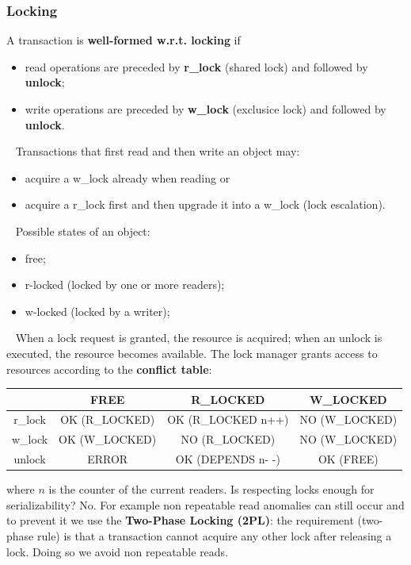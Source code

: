 \subsubsection{Locking}
A transaction is \textbf{well-formed w.r.t. locking} if
\begin{itemize}
    \item read operations are preceded by \textbf{r\_lock} (shared lock) and followed by \textbf{unlock};
    \item write operations are preceded by \textbf{w\_lock} (exclusice lock) and followed by \textbf{unlock}.
\end{itemize}
\ \newline
Transactions that first read and then write an object may:
\begin{itemize}
    \item acquire a w\_lock already when reading or
    \item acquire a r\_lock first and then upgrade it into a w\_lock (lock escalation).
\end{itemize}
\ \newline
Possible states of an object:
\begin{itemize}
    \item free;
    \item r-locked (locked by one or more readers);
    \item w-locked (locked by a writer);
\end{itemize}
\ \newline
When a lock request is granted, the resource is acquired; when an unlock is executed, the resource becomes available.\newline
The lock manager grants access to resources according to the \textbf{conflict table}:
\renewcommand{\arraystretch}{1.5}
\begin{center}
    \begin{tabular}{ |c|c c c| } 
     \hline
     & FREE & R\_LOCKED & W\_LOCKED \\ 
     \hline
     r\_lock & OK (R\_LOCKED) & OK (R\_LOCKED n++) & NO (W\_LOCKED) \\ 
     w\_lock & OK (W\_LOCKED) & NO (R\_LOCKED) & NO (W\_LOCKED)\\ 
     unlock & ERROR & OK (DEPENDS n- -) & OK (FREE) \\ 
     \hline
    \end{tabular}
\end{center}
\renewcommand{\arraystretch}{1}
where $n$ is the counter of the current readers.\newline
\newline
Is respecting locks enough for serializability? No. For example non repeatable read anomalies can still occur and to prevent it we use the \textbf{Two-Phase Locking (2PL)}: the requirement (two-phase rule) is that a transaction cannot acquire any other lock after releasing a lock. Doing so we avoid non repeatable reads.